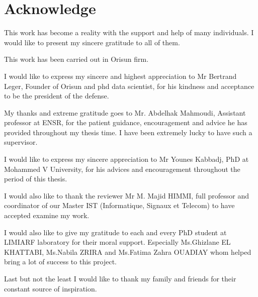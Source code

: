 \chapter*{Acknowledge}

\begin{center}
\Large{ \bf{ \it
{\selectfont

This work has become a reality with the support and  help of many individuals. I would like to present my sincere gratitude to all of them.

This work has been carried out in  Orisun firm.

I would like to express my sincere and highest appreciation to Mr Bertrand Leger, Founder  of Orisun  and phd data scientist, for his kindness and acceptance to be the president of the defense.

My thanks and extreme gratitude goes to Mr. Abdelhak Mahmoudi, Assistant professor at ENSR, for the patient guidance, encouragement and advice he has provided throughout my thesis time. I have been extremely lucky to have such a supervisor.

I would like to express my sincere appreciation to Mr Younes Kabbadj, PhD at Mohammed V University, for his  advices and encouragement throughout the period of this thesis. 

I would also like to thank the reviewer Mr M. Majid HIMMI, full professor and coordinator of our Master IST (Informatique, Signaux et Telecom) to have accepted  examine my work.


I would also like to give my gratitude to each and every PhD student at LIMIARF laboratory for their moral support. Especially Ms.Ghizlane EL KHATTABI, Ms.Nabila ZRIRA and Ms.Fatima Zahra OUADIAY whom  helped bring a lot of success to this project.  

Last but not the least I would like to thank my family and friends for their constant source of inspiration.
}
}
}
\end{center}